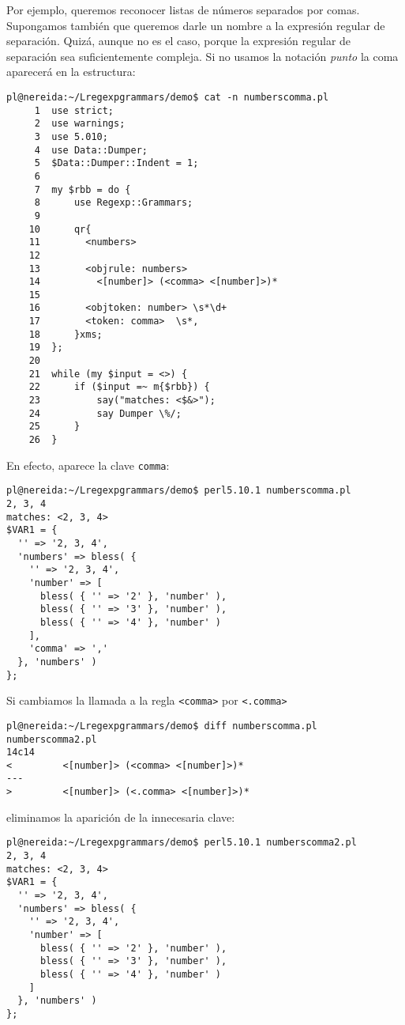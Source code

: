 
Por ejemplo, queremos reconocer listas de números separados por comas.
Supongamos también que queremos
darle un nombre a la expresión regular de separación.
Quizá, aunque no es el caso, porque la expresión
regular de separación sea suficientemente compleja.
Si no usamos la notación \emph{punto} la coma aparecerá en la estructura:

\begin{verbatim}
pl@nereida:~/Lregexpgrammars/demo$ cat -n numberscomma.pl
     1  use strict;
     2  use warnings;
     3  use 5.010;
     4  use Data::Dumper;
     5  $Data::Dumper::Indent = 1;
     6
     7  my $rbb = do {
     8      use Regexp::Grammars;
     9
    10      qr{
    11        <numbers>
    12
    13        <objrule: numbers>
    14          <[number]> (<comma> <[number]>)*
    15
    16        <objtoken: number> \s*\d+
    17        <token: comma>  \s*,
    18      }xms;
    19  };
    20
    21  while (my $input = <>) {
    22      if ($input =~ m{$rbb}) {
    23          say("matches: <$&>");
    24          say Dumper \%/;
    25      }
    26  }
\end{verbatim}
En efecto, aparece la clave \verb|comma|:
\begin{verbatim}
pl@nereida:~/Lregexpgrammars/demo$ perl5.10.1 numberscomma.pl
2, 3, 4
matches: <2, 3, 4>
$VAR1 = {
  '' => '2, 3, 4',
  'numbers' => bless( {
    '' => '2, 3, 4',
    'number' => [
      bless( { '' => '2' }, 'number' ),
      bless( { '' => '3' }, 'number' ),
      bless( { '' => '4' }, 'number' )
    ],
    'comma' => ','
  }, 'numbers' )
};
\end{verbatim}
Si cambiamos la llamada a la regla \verb|<comma>| por 
\verb|<.comma>| 

\begin{verbatim}
pl@nereida:~/Lregexpgrammars/demo$ diff numberscomma.pl numberscomma2.pl
14c14
<         <[number]> (<comma> <[number]>)*
---
>         <[number]> (<.comma> <[number]>)*
\end{verbatim}
eliminamos la aparición de la innecesaria clave:

\begin{verbatim}
pl@nereida:~/Lregexpgrammars/demo$ perl5.10.1 numberscomma2.pl
2, 3, 4
matches: <2, 3, 4>
$VAR1 = {
  '' => '2, 3, 4',
  'numbers' => bless( {
    '' => '2, 3, 4',
    'number' => [
      bless( { '' => '2' }, 'number' ),
      bless( { '' => '3' }, 'number' ),
      bless( { '' => '4' }, 'number' )
    ]
  }, 'numbers' )
};

\end{verbatim}

